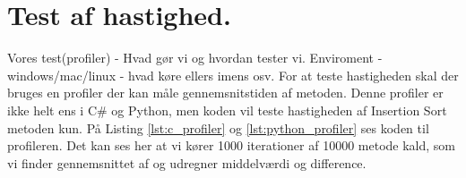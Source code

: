 \documentclass[class=report, crop=false]{standalone}
\begin{document}
    \section{Test af hastighed.}
    Vores test(profiler) -\> Hvad gør vi og hvordan tester vi. Enviroment - windows/mac/linux - hvad køre ellers imens osv.
    For at teste hastigheden skal der bruges en profiler der kan måle gennemsnitstiden af metoden. Denne profiler er ikke helt ens i C\# og Python, men koden vil teste hastigheden af Insertion Sort metoden kun. På Listing \ref{lst:c_profiler} og \ref{lst:python_profiler} ses koden til profileren. Det kan ses her at vi kører 1000 iterationer af 10000 metode kald, som vi finder gennemsnittet af og udregner middelværdi og difference.
    \begin{tcolorbox}
        \lstset{style=codestyle}
        C}, lastline=22, caption={C\# Profiler}, label={lst:c_profiler}]{Kode/Profiler.cs}
    \end{tcolorbox}
    \begin{tcolorbox}
        \lstset{style=codestyle}
        
    \end{tcolorbox}
\end{document}
